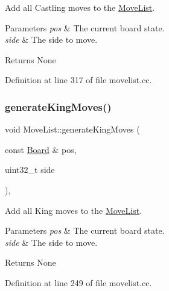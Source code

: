 Add all Castling moves to the \mbox{\hyperlink{classMoveList}{Move\+List}}. 


\begin{DoxyParams}{Parameters}
{\em pos} & The current board state. \\
\hline
{\em side} & The side to move. \\
\hline
\end{DoxyParams}
\begin{DoxyReturn}{Returns}
None 
\end{DoxyReturn}


Definition at line 317 of file movelist.\+cc.

\mbox{\label{classMoveList_a01f21c1bed30c674219746d10c0a7aa7}} 
\subsubsection{\texorpdfstring{generate\+King\+Moves()}{generateKingMoves()}}
{\footnotesize\ttfamily void Move\+List\+::generate\+King\+Moves (\begin{DoxyParamCaption}\item[{const \mbox{\hyperlink{classBoard}{Board}} \&}]{pos,  }\item[{uint32\+\_\+t}]{side }\end{DoxyParamCaption})\hspace{0.3cm}{\ttfamily [private]}, {\ttfamily [noexcept]}}



Add all King moves to the \mbox{\hyperlink{classMoveList}{Move\+List}}. 


\begin{DoxyParams}{Parameters}
{\em pos} & The current board state. \\
\hline
{\em side} & The side to move. \\
\hline
\end{DoxyParams}
\begin{DoxyReturn}{Returns}
None 
\end{DoxyReturn}


Definition at line 249 of file movelist.\+cc.

\mbox{\label{classMoveList_aec2684c095f75d4215908b140d604635}} 
